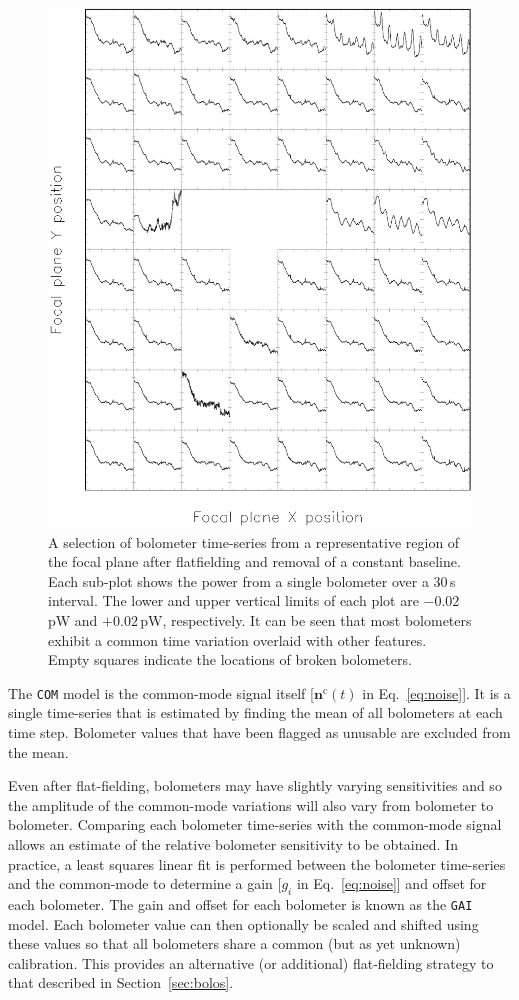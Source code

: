 \documentclass[useAMS,usenatbib,nofootinbib]{mn2e}
\newcommand{\model}[1]{\texttt{#1}}
\begin{document}
\begin{figure}
\centering
\includegraphics[width=\linewidth]{com}
\caption{A selection of bolometer time-series from a representative
region of the focal plane after flatfielding and removal of a constant
baseline. Each sub-plot shows the power from a single bolometer over a
30\,s interval.  The lower and upper vertical limits of each plot are
$-0.02$\,pW and $+0.02$\,pW, respectively. It can be seen that most
bolometers exhibit a common time variation overlaid with other
features. Empty squares indicate the locations of broken bolometers.}
\label{fig:com}
\end{figure}

The \model{COM} model is the common-mode signal itself
[$\mathbf{n}^\mathrm{c}(t)$ in Eq.~\ref{eq:noise}]. It is a single
time-series that is estimated by finding the mean of all bolometers at
each time step. Bolometer values that have been flagged as unusable
are excluded from the mean.

Even after flat-fielding, bolometers may have slightly varying
sensitivities and so the amplitude of the common-mode variations will
also vary from bolometer to bolometer. Comparing each bolometer
time-series with the common-mode signal allows an estimate of the
relative bolometer sensitivity to be obtained. In practice, a least
squares linear fit is performed between the bolometer time-series and
the common-mode to determine a gain [$g_i$ in Eq.~\ref{eq:noise}] and
offset for each bolometer.  The gain and offset for each bolometer is
known as the \model{GAI} model. Each bolometer value can then
optionally be scaled and shifted using these values so that all
bolometers share a common (but as yet unknown) calibration. This
provides an alternative (or additional) flat-fielding strategy to that
described in Section~\ref{sec:bolos}.
\end{document}
